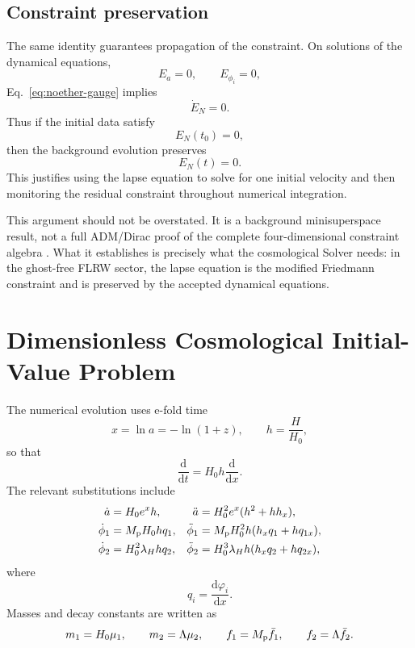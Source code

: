 \documentclass[aps,prd,twocolumn,superscriptaddress,nofootinbib,longbibliography]{revtex4-2}
\newcommand{\dd}{\mathrm{d}}
\newcommand{\Mp}{M_{\rm p}}
\newcommand{\Lam}{\Lambda}
\begin{document}
\subsection{Constraint preservation}
\label{subsec:constraint-preservation}

The same identity guarantees propagation of the constraint.  On solutions of the dynamical equations,
\begin{equation}
E_a=0,\qquad E_{\phi_i}=0,
\end{equation}
Eq.~\eqref{eq:noether-gauge} implies
\begin{equation}
\dot E_N=0.
\end{equation}
Thus if the initial data satisfy
\begin{equation}
E_N(t_0)=0,
\end{equation}
then the background evolution preserves
\begin{equation}
E_N(t)=0.
\end{equation}
This justifies using the lapse equation to solve for one initial velocity and then monitoring the residual constraint throughout numerical integration.

This argument should not be overstated.  It is a background minisuperspace result, not a full ADM/Dirac proof of the complete four-dimensional constraint algebra \cite{Dirac1958,ADM1962}.  What it establishes is precisely what the cosmological Solver needs: in the ghost-free FLRW sector, the lapse equation is the modified Friedmann constraint and is preserved by the accepted dynamical equations.

\section{Dimensionless Cosmological Initial-Value Problem}
\label{sec:ivp}

The numerical evolution uses e-fold time
\begin{equation}
x=\ln a=-\ln(1+z),
\qquad
h=\frac{H}{H_0},
\label{eq:xh}
\end{equation}
so that
\begin{equation}
\frac{\dd}{\dd t}=H_0h\frac{\dd}{\dd x}.
\label{eq:chain-rule}
\end{equation}
The relevant substitutions include
\begin{align}
\dot a&=H_0e^xh,
&
\ddot a&=H_0^2e^x(h^2+hh_x),\\
\dot\phi_1&=\Mp H_0h q_1,
&
\ddot\phi_1&=\Mp H_0^2h(h_xq_1+hq_{1x}),\\
\dot\phi_2&=H_0^2\lambda_H h q_2,
&
\ddot\phi_2&=H_0^3\lambda_H h(h_xq_2+hq_{2x}),
\label{eq:rescalings}
\end{align}
where
\begin{equation}
q_i=\frac{\dd\varphi_i}{\dd x}.
\end{equation}
Masses and decay constants are written as
\begin{equation}
m_1=H_0\mu_1,\qquad
m_2=\Lam\mu_2,\qquad
f_1=\Mp \bar f_1,\qquad
f_2=\Lam \bar f_2 .
\end{equation}
\end{document}
